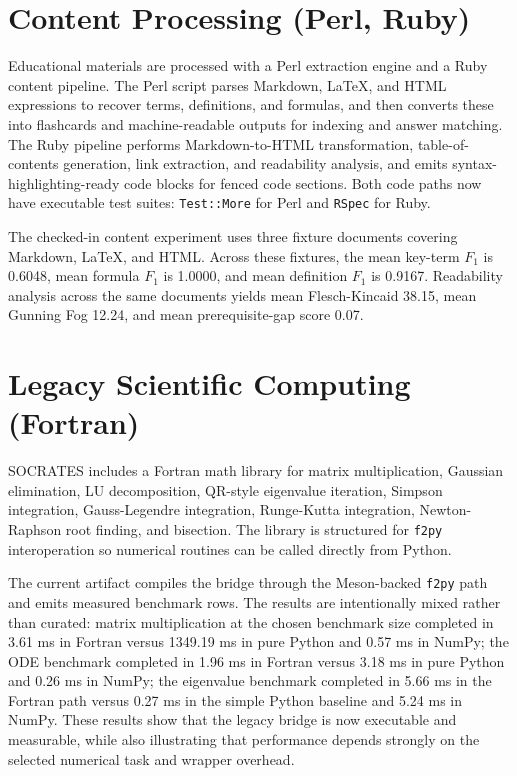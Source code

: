 \documentclass[conference]{IEEEtran}
\begin{document}
\section{Content Processing (Perl, Ruby)}
Educational materials are processed with a Perl extraction engine and a Ruby content pipeline. The Perl script parses Markdown, LaTeX, and HTML expressions to recover terms, definitions, and formulas, and then converts these into flashcards and machine-readable outputs for indexing and answer matching. The Ruby pipeline performs Markdown-to-HTML transformation, table-of-contents generation, link extraction, and readability analysis, and emits syntax-highlighting-ready code blocks for fenced code sections. Both code paths now have executable test suites: \texttt{Test::More} for Perl and \texttt{RSpec} for Ruby.

The checked-in content experiment uses three fixture documents covering Markdown, LaTeX, and HTML. Across these fixtures, the mean key-term $F_1$ is 0.6048, mean formula $F_1$ is 1.0000, and mean definition $F_1$ is 0.9167. Readability analysis across the same documents yields mean Flesch-Kincaid 38.15, mean Gunning Fog 12.24, and mean prerequisite-gap score 0.07.

\section{Legacy Scientific Computing (Fortran)}
SOCRATES includes a Fortran math library for matrix multiplication, Gaussian elimination, LU decomposition, QR-style eigenvalue iteration, Simpson integration, Gauss-Legendre integration, Runge-Kutta integration, Newton-Raphson root finding, and bisection. The library is structured for \texttt{f2py} interoperation so numerical routines can be called directly from Python.

The current artifact compiles the bridge through the Meson-backed \texttt{f2py} path and emits measured benchmark rows. The results are intentionally mixed rather than curated: matrix multiplication at the chosen benchmark size completed in 3.61 ms in Fortran versus 1349.19 ms in pure Python and 0.57 ms in NumPy; the ODE benchmark completed in 1.96 ms in Fortran versus 3.18 ms in pure Python and 0.26 ms in NumPy; the eigenvalue benchmark completed in 5.66 ms in the Fortran path versus 0.27 ms in the simple Python baseline and 5.24 ms in NumPy. These results show that the legacy bridge is now executable and measurable, while also illustrating that performance depends strongly on the selected numerical task and wrapper overhead.
\end{document}
